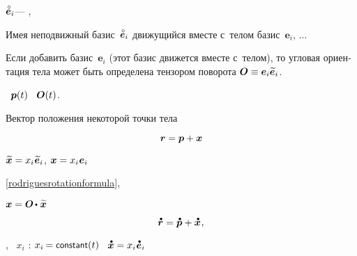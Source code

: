 ${\mathcircabove{\bm{e}}_i}$\:--- ,  

\foreignlanguage{russian}{Имея неподвижный базис~${\mathcircabove{\bm{e}}_i}$  движущийся вместе с~телом базис~${\bm{e}_i}$, ...}

\foreignlanguage{russian}{Если добавить базис~${\bm{e}_i}$ (этот базис движется вместе с~телом), то угловая ориентация тела может быть определена тензором поворота ${\bm{O} \equiv \bm{e}_i \widetilde{\bm{e}}_i}$.}

   ~${\bm{p}(t)}$ ~${\bm{O}(t)}$.

\foreignlanguage{russian}{Вектор положения некоторой точки тела}

\nopagebreak\vspace{-0.2em}\begin{equation}\label{completelyrigidbody.locationvectorofanypointdecomposed}
\bm{r} = \bm{p} + \bm{x}
\end{equation}

${\widetilde{\bm{x}} = x_i \hspace{.1ex} \widetilde{\bm{e}}_i}$,
${\bm{x} = x_i \hspace{.1ex} \bm{e}_i}$

\eqref{rodriguesrotationformula}, 

${\bm{x} = \rotationtensor \hspace{-0.15ex} \dotp \hspace{.1ex} \widetilde{\bm{x}}}$

\begin{equation*}
\mathdotabove{\locationvector} = \mathdotabove{\positionofthepole} + \mathdotabove{\bm{x}}
\hspace{.1ex} ,
\end{equation*}

, ~${x_i}$ :
${x_i \hspace{-0.16ex} = \constant(t)}$ ~${\mathdotabove{\bm{x}} = x_i \hspace{.1ex} \mathdotabove{\bm{e}}_i}$

